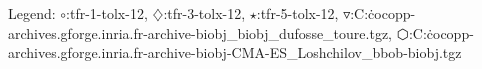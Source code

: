 Legend: {\color{NavyBlue}$\circ$}:tfr-1-tolx-12, {\color{Magenta}$\diamondsuit$}:tfr-3-tolx-12, {\color{Orange}$\star$}:tfr-5-tolx-12, {\color{CornflowerBlue}$\triangledown$}:C:\Users\dimo\.cocopp\data-archives\coco.gforge.inria.fr\data-archive\bbob-biobj\_biobj\_dufosse\_toure.tgz, {\color{red}$\varhexagon$}:C:\Users\dimo\.cocopp\data-archives\coco.gforge.inria.fr\data-archive\bbob-biobj\HMO-CMA-ES\_Loshchilov\_bbob-biobj.tgz